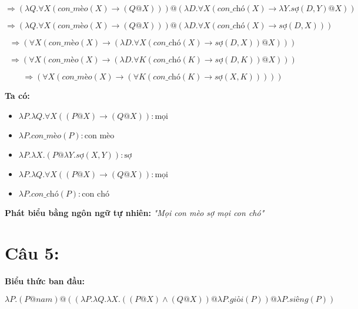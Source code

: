 \documentclass[a4paper, 15pt]{article}
\begin{document}
\[
\Rightarrow
\left( \lambda Q. \forall X (\textit{con\_mèo}(X) \rightarrow (Q @ X)) \right)
@ 
\left( \lambda D. \forall X (\textit{con\_chó}(X) \rightarrow \lambda Y. \textit{sợ}(D, Y) @ X) \right)
\]

\[
\Rightarrow
\left( \lambda Q . \forall X \left( \textit{con\_mèo}(X) \rightarrow (Q @ X) \right) \right)
@ 
\left( \lambda D . \forall X \left( \textit{con\_chó}(X) \rightarrow \textit{sợ}(D, X) \right) \right)
\]

\[
\Rightarrow
\left( \forall X \left( \textit{con\_mèo}(X) \rightarrow \left( \lambda D. \forall X \left( \textit{con\_chó}(X) \rightarrow \textit{sợ}(D, X) \right) @ X \right) \right) \right)
\]

\[
\Rightarrow
\left( \forall X \left( \textit{con\_mèo}(X) \rightarrow \left( \lambda D. \forall K \left( \textit{con\_chó}(K) \rightarrow \textit{sợ}(D, K) \right) @ X \right) \right) \right)
\]

\[
\Rightarrow
\left( \forall X \left( \textit{con\_mèo}(X) \rightarrow \left( \forall K \left( \textit{con\_chó}(K) \rightarrow \textit{sợ}(X, K) \right) \right) \right) \right)
\]

\textbf{Ta có:}

\begin{itemize}
    \item $\lambda P. \lambda Q. \forall X ((P @ X) \rightarrow (Q @ X)) : \text{mọi}$
    \item $\lambda P. \textit{con\_mèo}(P) : \text{con mèo} $
    \item $\lambda P. \lambda X. (P @ \lambda Y. \textit{sợ}(X, Y)) : \text{sợ}$
    \item $\lambda P. \lambda Q. \forall X ((P @ X) \rightarrow (Q @ X)) : \text{mọi}$
    \item $\lambda P. \textit{con\_chó}(P) : \text{con chó}$
\end{itemize}

\textbf{Phát biểu bằng ngôn ngữ tự nhiên: }
\textit{"Mọi con mèo sợ mọi con chó"}

\vspace{10pt}

\section*{Câu 5:}

\textbf{Biểu thức ban đầu:}

\[
\lambda P . (P @ \textit{nam}) @ \left( \left( \lambda P . \lambda Q . \lambda X . \left( (P @ X) \land (Q @ X) \right) @ \lambda P . \textit{giỏi}(P) \right) @ \lambda P . \textit{siêng}(P) \right)
\]
\end{document}
